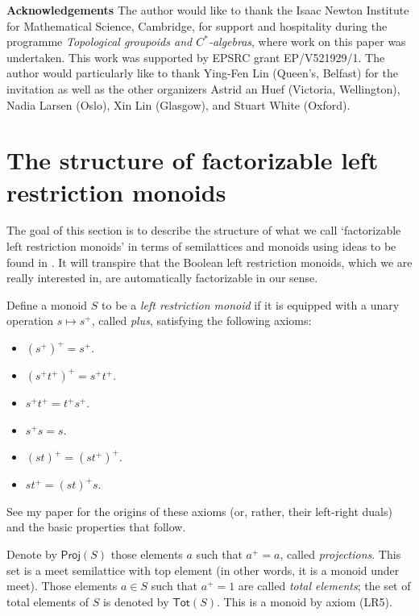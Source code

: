 \documentclass[a4paper]{amsart}
\begin{document}
\noindent
{\bf Acknowledgements }The author would like to thank the Isaac Newton Institute for Mathematical Science, Cambridge,
for support and hospitality during the programme {\em Topological groupoids and $C^{\ast}$-algebras},
where work on this paper was undertaken.
This work was supported by EPSRC grant EP/V521929/1.
The author would particularly like to thank
Ying-Fen Lin (Queen's, Belfast) for the invitation
as well as the other organizers
Astrid an Huef (Victoria, Wellington),
Nadia Larsen (Oslo),
Xin Lin (Glasgow),
and
Stuart White (Oxford).\\





\section{The structure of factorizable  left restriction monoids}

The goal of this section is to describe the structure of what we call `factorizable left restriction monoids'
in terms of semilattices and monoids using ideas to be found in \cite{G2025}.
It will transpire that the Boolean left restriction monoids, which we are really interested in,
are automatically factorizable in our sense.

Define a monoid $S$ to be a {\em left restriction monoid} if
it is equipped with a unary operation $s \mapsto s^{+}$, called {\em plus}, satisfying the following axioms:
\begin{itemize}
\item[{\rm (LR1).}] $(s^{+})^{+} = s^{+}$. 
\item[{\rm (LR2).}] $(s^{+}t^{+})^{+} = s^{+}t^{+}$.
\item[{\rm (LR3).}] $s^{+}t^{+} = t^{+}s^{+}$.
\item[{\rm (LR4).}] $s^{+}s = s$.
\item[{\rm (LR5).}] $(st)^{+} = (st^{+})^{+}$.
\item[{\rm (LR6).}] $st^{+} = (st)^{+}s$.
\end{itemize}
See my paper \cite{L2025} for the origins of these axioms (or, rather, their left-right duals)
and the basic properties that follow.

Denote by $\mathsf{Proj}(S)$ those elements $a$ such that $a^{+} = a$, called {\em projections}.
This set is a meet semilattice with top element (in other words, it is a monoid under meet).
Those elements $a \in S$ such that $a^{+} = 1$ are called  {\em total elements};
the set of total elements of $S$ is denoted by $\mathsf{Tot}(S)$.
This is a monoid by axiom (LR5).
\end{document}
